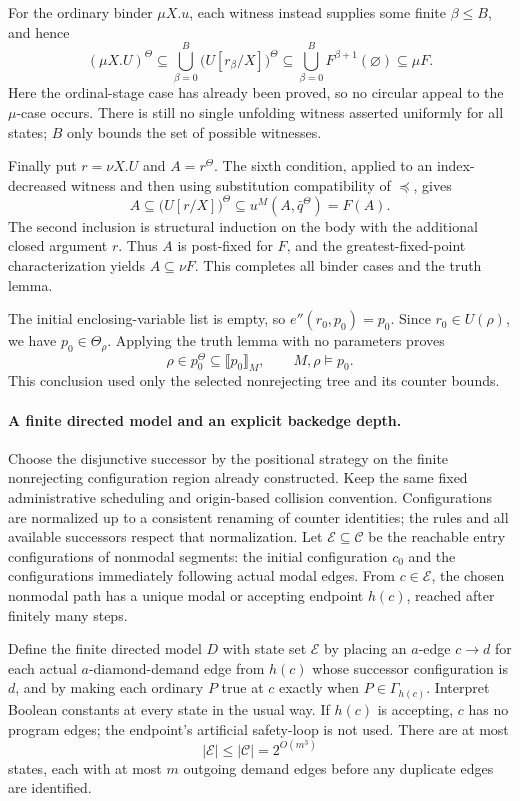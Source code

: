 For the ordinary binder \(\mu X.u\), each
witness instead supplies some finite
\(\beta\leq B\), and hence
\[
 (\mu X.U)^\Theta
       \subseteq\bigcup_{\beta=0}^{B}
                  \bigl(U[r_\beta/X]\bigr)^\Theta
       \subseteq\bigcup_{\beta=0}^{B}
                  F^{\beta+1}(\varnothing)
       \subseteq\mu F.
\]
Here the ordinal-stage case has already been proved,
so no circular appeal to the \(\mu\)-case occurs.
There is still no single unfolding witness asserted
uniformly for all states; \(B\) only bounds the
set of possible witnesses.

Finally put \(r=\nu X.U\) and \(A=r^\Theta\).
The sixth condition, applied to an index-decreased
witness and then using substitution compatibility
of \(\preceq\), gives
\[
 A\subseteq\bigl(U[r/X]\bigr)^\Theta
       \subseteq u^M(A,\bar q^\Theta)=F(A).
\]
The second inclusion is structural induction on
the body with the additional closed argument
\(r\). Thus \(A\) is post-fixed for \(F\),
and the greatest-fixed-point characterization yields
\(A\subseteq\nu F\). This completes all binder
cases and the truth lemma.

The initial enclosing-variable list is empty, so
\(e''(r_0,p_0)=p_0\). Since
\(r_0\in U(\rho)\), we have
\(p_0\in\Theta_\rho\). Applying the truth
lemma with no parameters proves
\[
 \rho\in p_0^\Theta\subseteq\llbracket p_0\rrbracket_M,
 \qquad M,\rho\models p_0.
\]
This conclusion used only the selected nonrejecting
tree and its counter bounds.

\paragraph{A finite directed model and an explicit backedge depth.}
Choose the disjunctive successor by the positional
strategy on the finite nonrejecting configuration
region already constructed. Keep the same fixed
administrative scheduling and origin-based collision
convention. Configurations are normalized up to a
consistent renaming of counter identities; the rules
and all available successors respect that normalization.
Let \(\mathcal E\subseteq\mathcal C\) be the
reachable entry configurations of nonmodal segments:
the initial configuration \(c_0\) and the
configurations immediately following actual modal
edges. From \(c\in\mathcal E\), the chosen
nonmodal path has a unique modal or accepting
endpoint \(h(c)\), reached after finitely many steps.

Define the finite directed model \(D\) with
state set \(\mathcal E\) by placing an
\(a\)-edge \(c\to d\) for each actual
\(a\)-diamond-demand edge from \(h(c)\)
whose successor configuration is \(d\), and by
making each ordinary \(P\) true at \(c\) exactly when
\(P\in\Gamma_{h(c)}\). Interpret Boolean constants
at every state in the usual way. If \(h(c)\)
is accepting, \(c\) has no program edges; the
endpoint's artificial safety-loop
is not used. There are at most
\[
 |\mathcal E|\leq|\mathcal C|=2^{O(m^3)}
\]
states, each with at most \(m\) outgoing demand
edges before any duplicate edges are identified.

